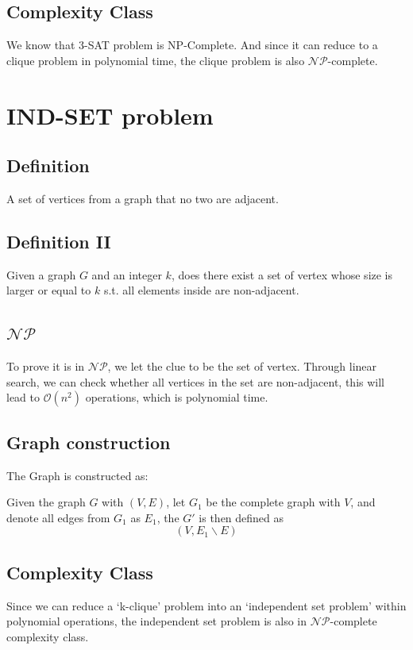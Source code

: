 \documentclass[A4paper]{article}
\begin{document}
\subsection{Complexity Class}
We know that 3-SAT problem is NP-Complete. And since it can reduce to a clique problem in polynomial time, the clique problem is also $\mathcal{NP}$-complete.
\newpage
\section{IND-SET problem}
\subsection{Definition}
A set of vertices from a graph that no two are adjacent.
\subsection{Definition II}
Given a graph $G$ and an integer $k$, does there exist a set of vertex whose size is larger or equal to $k$ s.t. all elements inside are non-adjacent.
\subsection{$\mathcal{NP}$}
To prove it is in $\mathcal{NP}$, we let the clue to be the set of vertex. Through linear search, we can check whether all vertices in the set are non-adjacent, this will lead to $\mathcal{O}(n^2)$ operations, which is polynomial time. 
\subsection{Graph construction}
The Graph is constructed as: 

Given the graph $G$ with $(V,E)$, let $G_1$ be the complete graph with $V$, and denote all edges from $G_1$ as $E_1$, the $G'$ is then defined as 
\[
	(V, E_1\backslash E)
\]
\subsection{Complexity Class}
Since we can reduce a `k-clique' problem into an `independent set problem' within polynomial operations, the independent set problem is also in $\mathcal{NP}$-complete complexity class.
\end{document}

